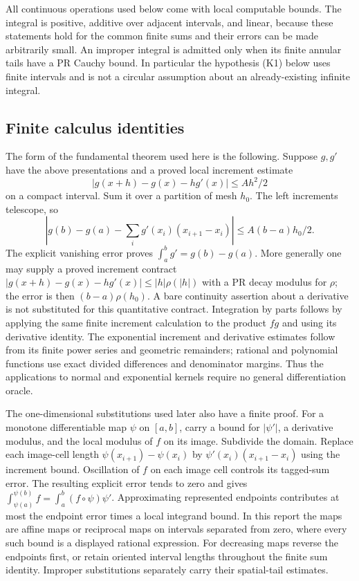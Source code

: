 All continuous operations used below come with local computable bounds.
The integral is positive, additive over adjacent intervals, and linear,
because these statements hold for the common finite sums and their errors
can be made arbitrarily small. An improper integral is admitted only when
its finite annular tails have a PR Cauchy bound. In particular the hypothesis
(K1) below uses finite intervals and is not a circular assumption about an
already-existing infinite integral.

\subsection{Finite calculus identities}

The form of the fundamental theorem used here is the following. Suppose
$g,g'$ have the above presentations and a proved local increment estimate
\[
 |g(x+h)-g(x)-hg'(x)|\le Ah^2/2
\]
on a compact interval. Sum it over a partition of mesh $h_0$. The left
increments telescope, so
\[
 \left|g(b)-g(a)-\sum_i g'(x_i)(x_{i+1}-x_i)\right|
 \le A(b-a)h_0/2.
\]
The explicit vanishing error proves $\int_a^b g'=g(b)-g(a)$.
More generally one may supply a proved increment contract
$|g(x+h)-g(x)-hg'(x)|\le |h|\rho(|h|)$ with a PR decay modulus for $\rho$;
the error is then $(b-a)\rho(h_0)$. A bare continuity assertion about a
derivative is not substituted for this quantitative contract. Integration by parts follows by applying
the same finite increment calculation to the product $fg$ and using its
derivative identity. The exponential increment and derivative estimates
follow from its finite power series and geometric remainders; rational and
polynomial functions use exact divided differences and denominator margins.
Thus the applications to normal and exponential kernels require no general
differentiation oracle.

The one-dimensional substitutions used later also have a finite proof.
For a monotone differentiable map $\psi$ on $[a,b]$, carry a bound for
$|\psi'|$, a derivative modulus, and the local modulus of $f$ on its image.
Subdivide the domain. Replace each image-cell length
$\psi(x_{i+1})-\psi(x_i)$ by
$\psi'(x_i)(x_{i+1}-x_i)$ using the increment bound. Oscillation of $f$
on each image cell controls its tagged-sum error. The resulting explicit
error tends to zero and gives
$\int_{\psi(a)}^{\psi(b)}f=\int_a^b(f\circ\psi)\psi'$.
Approximating represented endpoints contributes at most the endpoint error
times a local integrand bound. In this report the maps are affine maps or
reciprocal maps on intervals separated from zero, where every such bound
is a displayed rational expression. For decreasing maps reverse the
endpoints first, or retain oriented interval lengths throughout the finite
sum identity. Improper substitutions separately carry
their spatial-tail estimates.

